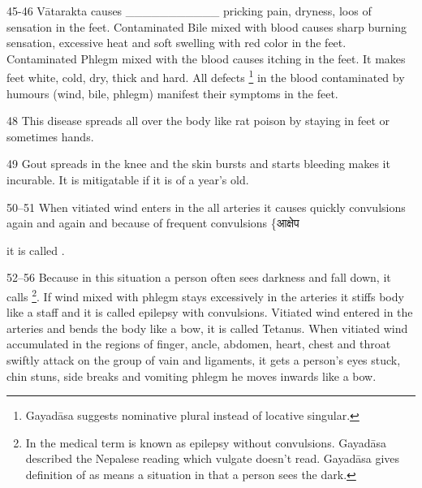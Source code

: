 \begin{translation}
{\item[45-46] Vātarakta causes ___________ pricking pain, dryness, loos of sensation in the feet. Contaminated Bile mixed with blood causes sharp burning sensation, excessive heat and soft swelling with red color in the feet. Contaminated Phlegm mixed with the blood causes itching in the feet. It makes feet white, cold, dry, thick and hard. All defects \footnote{Gayadāsa suggests  nominative plural instead of locative singular.} in the blood contaminated by humours (wind, bile, phlegm) manifest their symptoms in the feet.

\item[48] This disease spreads all over the body like rat poison by staying in feet or sometimes hands.

\item[49] Gout spreads in the knee and the skin bursts and starts bleeding makes it incurable. It is mitigatable if it is of a year’s old.

\item[50--51] When vitiated wind enters in the all arteries it causes quickly convulsions again and again and because of frequent convulsions \{आक्षेप} it is called .

\item[52--56] Because in this situation a person often sees darkness and fall down, it calls  \footnote{In the medical term  is known as epilepsy without convulsions. Gayadāsa described the Nepalese reading  which vulgate doesn’t read. Gayadāsa gives definition of  as  means a situation in that a person sees the dark.}. If wind mixed with phlegm stays excessively in the arteries it stiffs body like a staff and it is called  epilepsy with convulsions. Vitiated wind entered in the arteries and bends the body like a bow, it is called  Tetanus. When vitiated wind accumulated in the regions of finger, ancle, abdomen, heart, chest and throat swiftly attack on the group of vain and ligaments, it gets a person’s eyes stuck, chin stuns, side breaks and vomiting phlegm he moves inwards like a bow. 




































\end{translation}
